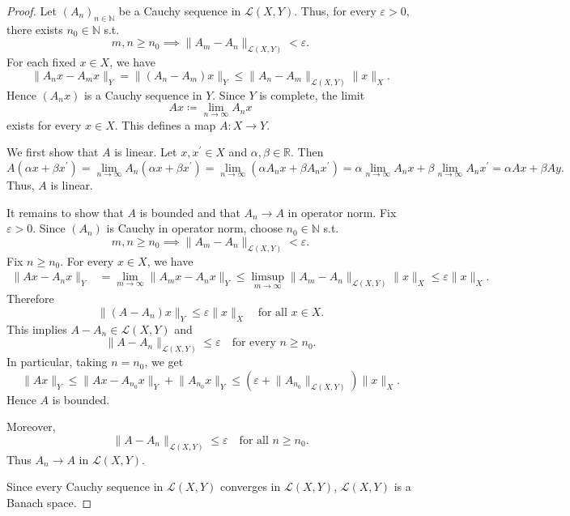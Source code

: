\begin{proof}
    Let \((A_n)_{n \in \mathbb{N}}\) be a Cauchy sequence in \(\mathcal{L} (X, Y)\). Thus, for every \(\varepsilon > 0\), there exists \(n_0 \in \mathbb{N} \) s.t. 
    \[
        m, n \ge n_0 \implies \lVert A_m - A_n \rVert_{\mathcal{L} (X, Y)} < \varepsilon. 
    \]    
    For each fixed \(x \in X\), we have 
    \[
        \lVert A_n x - A_m x \rVert_Y = \lVert (A_n - A_m) x \rVert_Y \le \lVert A_n - A_m \rVert_{\mathcal{L} (X, Y)} \lVert x \rVert_X.    
    \] 
    Hence \((A_n x)\) is a Cauchy sequence in \(Y\). Since \(Y\) is complete, the limit 
    \[
        Ax \coloneqq \lim_{n \to \infty} A_n x 
    \]  
    exists for every \(x \in X\). This defines a map \(A: X \to Y\). 

    We first show that \(A\) is linear. Let \(x, x^{\prime} \in X\) and \(\alpha , \beta \in \mathbb{R}\). Then 
    \[
        A (\alpha x + \beta x^{\prime} ) = \lim_{n \to \infty} A_n (\alpha x + \beta x^{\prime} ) = \lim_{n \to \infty} \left( \alpha A_n x + \beta A_n x^{\prime}  \right) = \alpha \lim_{n \to \infty} A_n x + \beta \lim_{n \to \infty} A_n x^{\prime} = \alpha Ax + \beta Ay.     
    \]     
    Thus, \(A\) is linear. 

    It remains to show that \(A\) is bounded and that \(A_n \to A\) in operator norm. Fix \(\varepsilon > 0\). Since \((A_n)\) is Cauchy in operator norm, choose \(n_0 \in \mathbb{N}\) s.t. 
    \[
        m, n \ge n_0 \implies \lVert A_m - A_n \rVert_{\mathcal{L} (X, Y)} < \varepsilon. 
    \]      
    Fix \(n \ge n_0\). For every \(x \in X\), we have 
    \begin{align*}
        \lVert A x - A_n x \rVert_Y &= \lim_{m \to \infty} \lVert A_m x - A_n x \rVert_Y \le \limsup_{m \to \infty} \lVert A_m - A_n \rVert_{\mathcal{L} (X, Y)} \lVert x \rVert_X \le \varepsilon \lVert x \rVert_X.      
    \end{align*}  
    Therefore 
    \[
        \lVert (A - A_n) x \rVert_Y \le \varepsilon \lVert x \rVert_X \quad \text{for all } x \in X.   
    \]
    This implies \(A - A_n \in \mathcal{L} (X, Y)\) and 
    \[
        \lVert A - A_n \rVert_{\mathcal{L} (X, Y)} \le \varepsilon \quad \text{for every } n \ge n_0.  
    \] 
    In particular, taking \(n = n_0\), we get 
    \[
        \lVert Ax \rVert_Y \le \lVert Ax - A_{n_0} x \rVert_Y + \lVert A_{n_0} x \rVert_Y \le \left( \varepsilon + \lVert A_{n_0} \rVert_{\mathcal{L} (X, Y)}  \right) \lVert x \rVert_X.     
    \] 
    Hence \(A\) is bounded. 

    Moreover, 
    \[
        \lVert A - A_n \rVert_{\mathcal{L} (X, Y)} \le \varepsilon \quad \text{for all } n \ge n_0.  
    \]
    Thus \(A_n \to A\) in \(\mathcal{L} (X, Y)\).

    Since every Cauchy sequence in \(\mathcal{L} (X, Y)\) converges in \(\mathcal{L} (X, Y)\), \(\mathcal{L} (X, Y)\) is a Banach space.     
\end{proof}


